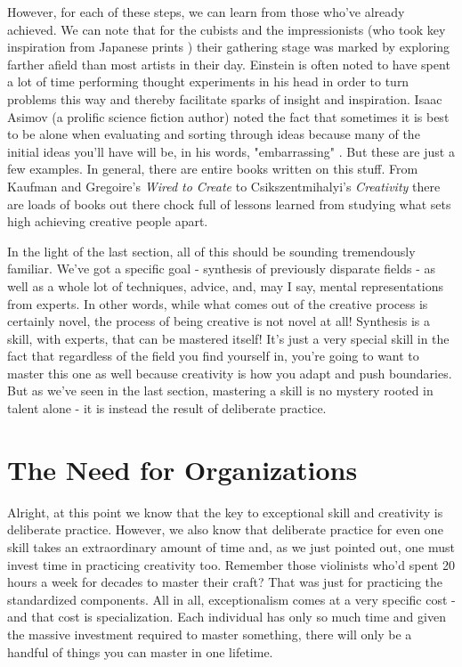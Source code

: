 \documentclass[11pt,a5paper]{book}
\begin{document}
However, for each of these steps, we can learn from those who've already achieved. We can note that for the cubists and the impressionists (who took key inspiration from Japanese prints \cite{impressionism}) their gathering stage was marked by exploring farther afield than most artists in their day. Einstein is often noted to have spent a lot of time performing thought experiments in his head in order to turn problems this way and thereby facilitate sparks of insight and inspiration. Isaac Asimov (a prolific science fiction author) noted the fact that sometimes it is best to be alone when evaluating and sorting through ideas because many of the initial ideas you'll have will be, in his words, "embarrassing" \cite{kaufman}. But these are just a few examples. In general, there are entire books written on this stuff. From Kaufman and Gregoire's \textit{Wired to Create} \cite{kaufman} to Csikszentmihalyi's \textit{Creativity} \cite{creativity} there are loads of books out there chock full of lessons learned from studying what sets high achieving creative people apart.
\newline

In the light of the last section, all of this should be sounding tremendously familiar. We've got a specific goal - synthesis of previously disparate fields - as well as a whole lot of techniques, advice, and, may I say, mental representations from experts. In other words, while what comes out of the creative process is certainly novel, the process of being creative is not novel at all! Synthesis is a skill, with experts, that can be mastered itself! It's just a very special skill in the fact that regardless of the field you find yourself in, you're going to want to master this one as well because creativity is how you adapt and push boundaries. But as we've seen in the last section, mastering a skill is no mystery rooted in talent alone - it is instead the result of deliberate practice. 

\section{The Need for Organizations}
Alright, at this point we know that the key to exceptional skill and creativity is deliberate practice. However, we also know that deliberate practice for even one skill takes an extraordinary amount of time and, as we just pointed out, one must invest time in practicing creativity too. Remember those violinists who'd spent 20 hours a week for decades to master their craft? That was just for practicing the standardized components. All in all, exceptionalism comes at a very specific cost - and that cost is specialization. Each individual has only so much time and given the massive investment required to master something, there will only be a handful of things you can master in one lifetime.
\newline
\end{document}
